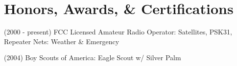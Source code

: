 \documentclass[letter,20pt]{article}
\makeatletter
\newcommand{\resumeSubheading}[4]{
  \vspace{-1pt}\item
    \begin{tabular*}{0.97\textwidth}{l@{\extracolsep{\fill}}r}
      \textbf{#1} & #2 \\
      \textit{#3} & \textit{#4} \\
    \end{tabular*}\vspace{-5pt}
}
\newcommand{\resumeSubHeadingListStart}{\begin{itemize}[leftmargin=*]}
\newcommand{\resumeSubHeadingListEnd}{\end{itemize}}
\makeatother
\begin{document}
\section{Honors, Awards, \& Certifications}
\begin{description}[font=$\bullet$]
\item {(2000 - present) FCC Licensed Amateur Radio Operator: Satellites, PSK31, Repeater Nets: Weather \& Emergency}
\vspace{-5pt}
\item {(2004) Boy Scouts of America: Eagle Scout w/ Silver Palm}
\end{description}

\end{document}
